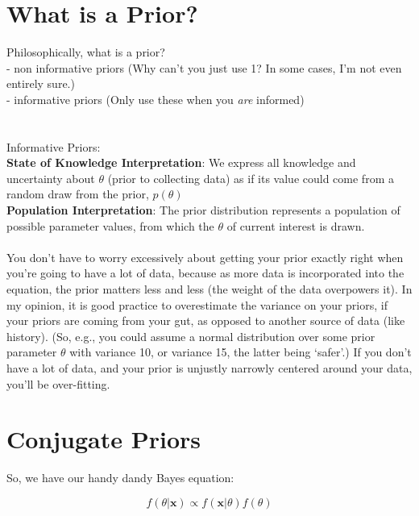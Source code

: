 \documentclass[12pt]{book}
\begin{document}
\section{What is a Prior?}
Philosophically, what is a prior? \\
- non informative priors (Why can't you just use 1? In some cases, I'm not even entirely sure.)\\  
- informative priors (Only use these when you \textit{are} informed)\\
\\\\
Informative Priors:\\
\textbf{State of Knowledge Interpretation}: We express all knowledge
and uncertainty about $\theta$ (prior to collecting data) as if its
value could come from a random draw from the prior, $p(\theta)$
\\
\textbf{Population Interpretation}: The prior distribution represents a
population of possible parameter values, from which the $\theta$ of
current interest is drawn.
\\\\
You don't have to worry excessively about getting your prior exactly right when you're going to have a lot of data, because as more data is incorporated into the equation, the prior matters less and less (the weight of the data overpowers it). In my opinion, it is good practice to overestimate the variance on your priors, if your priors are coming from your gut, as opposed to another source of data (like history). (So, e.g., you could assume a normal distribution over some prior parameter $\theta$ with variance 10, or variance 15, the latter being `safer'.) If you don't have a lot of data, and your prior is unjustly narrowly centered around your data, you'll be over-fitting.


\section{Conjugate Priors}

So, we have our handy dandy Bayes equation:

\begin{equation}
f(\theta|\textbf{x}) \propto f(\textbf{x}|\theta)f(\theta)
\end{equation}
\end{document}
